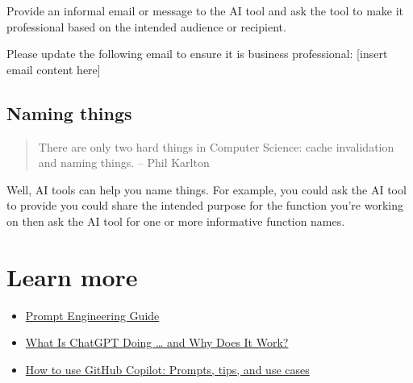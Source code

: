 \documentclass[
  letterpaper,
  DIV=11,
  numbers=noendperiod]{scrreprt}
\newenvironment{Shaded}{\begin{snugshade}}{\end{snugshade}}
\newcommand{\InformationTok}[1]{\textcolor[rgb]{0.37,0.37,0.37}{#1}}
\newcommand{\NormalTok}[1]{\textcolor[rgb]{0.00,0.23,0.31}{#1}}
\providecommand{\tightlist}{%
  \setlength{\itemsep}{0pt}\setlength{\parskip}{0pt}}\usepackage{longtable,booktabs,array}
\begin{document}
Provide an informal email or message to the AI tool and ask the tool to
make it professional based on the intended audience or recipient.

\begin{Shaded}
\begin{Highlighting}[]
\NormalTok{Please update the following email to ensure it is business }
\NormalTok{professional: }\InformationTok{\textasciigrave{}[insert email content here]\textasciigrave{}}
\end{Highlighting}
\end{Shaded}

\hypertarget{naming-things}{%
\section{Naming things}\label{naming-things}}

\begin{quote}
There are only two hard things in Computer Science: cache invalidation
and naming things. -- Phil Karlton
\end{quote}

Well, AI tools can help you name things. For example, you could ask the
AI tool to provide you could share the intended purpose for the function
you're working on then ask the AI tool for one or more informative
function names.


\hypertarget{learn-more}{%
\chapter{Learn more}\label{learn-more}}

\begin{itemize}
\tightlist
\item
  \href{https://www.promptingguide.ai/}{Prompt Engineering Guide}
\item
  \href{https://writings.stephenwolfram.com/2023/02/what-is-chatgpt-doing-and-why-does-it-work/}{What
  Is ChatGPT Doing \ldots{} and Why Does It Work?}
\item
  \href{https://github.blog/2023-06-20-how-to-write-better-prompts-for-github-copilot/}{How
  to use GitHub Copilot: Prompts, tips, and use cases}
\end{itemize}
\end{document}
